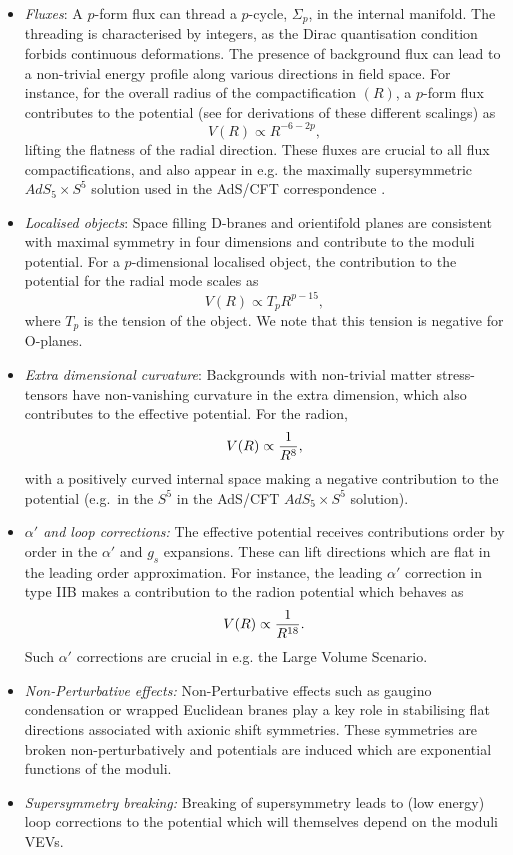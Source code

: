 \begin{itemize}

\item {\it Fluxes}: A $p$-form flux can thread a $p$-cycle, $\Sigma_p$, in the internal manifold. The threading is characterised by integers, as the Dirac quantisation condition forbids continuous deformations.
The presence of  background flux can  lead to a non-trivial energy profile along various directions in field space. For instance, for the 
overall radius of the compactification $(R)$, a $p$-form flux contributes to the potential (see \cite{Giddings:2003zw,Silverstein:2004id} 
for derivations of these different scalings) as 
$$
   V(R) \propto R^{-6 -2p},
$$
lifting the flatness of the radial direction. These fluxes are crucial to all flux compactifications, and also appear in e.g. the maximally supersymmetric $AdS_5 \times S^5$ solution used in the AdS/CFT correspondence \cite{Maldacena:1997re}.

\item {\it Localised objects}: Space filling D-branes and orientifold planes are consistent with maximal symmetry in four dimensions and contribute
to the moduli potential. For a $p$-dimensional localised object, the contribution to the potential for the radial mode scales as 
$$
  V(R) \propto T_p R^{p -15},
$$
where $T_p$ is the tension of the object. We note that this tension is negative for O-planes.

\item {\it Extra dimensional curvature}: Backgrounds with non-trivial matter stress-tensors have non-vanishing curvature in the
extra dimension, which also contributes to the effective potential. For the radion,
$$
  V(R) \propto {1 \over R^{8} },
$$
with a positively curved internal space making a negative contribution to the potential (e.g.~in the $S^5$ in the AdS/CFT $AdS_5 \times S^5$ solution).

\item{ \it $\alpha'$ and loop corrections:} The effective potential receives contributions order by order in the $\alpha'$ and $g_s$ expansions. These
can lift directions which are flat in the leading order approximation. For instance, the leading $\alpha'$ correction in type IIB  \cite{Becker:2002nn} makes a contribution to the radion potential which behaves as
$$
  V(R) \propto {1 \over R^{18}}.
$$
Such $\alpha'$ corrections are crucial in e.g. the Large Volume Scenario.

\item {\it Non-Perturbative effects:} Non-Perturbative effects such as gaugino condensation or wrapped Euclidean branes play a key role
in stabilising flat directions associated with axionic shift symmetries. These symmetries are broken non-perturbatively and  potentials are induced which are exponential functions of the moduli.

\item  {\it Supersymmetry breaking:} Breaking of supersymmetry leads to (low energy) loop corrections to the potential which will themselves depend on the moduli VEVs.

\end{itemize}

